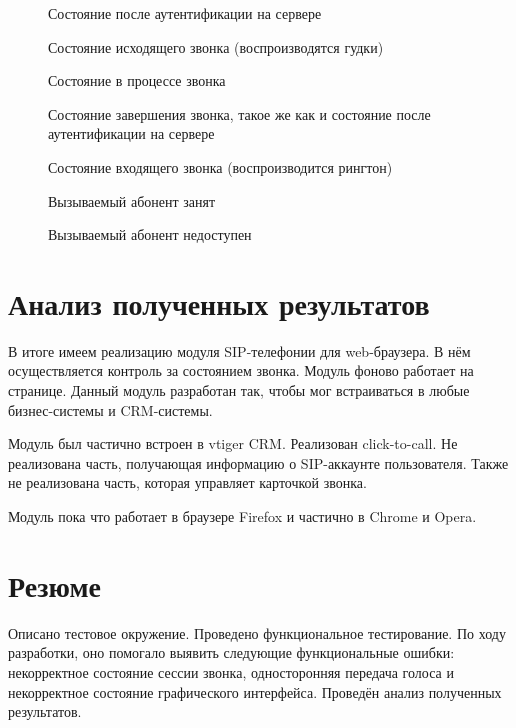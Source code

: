 \begin{figure}[h]
\caption{Состояние после аутентификации на сервере}
\label{image:test2}
\end{figure}

\begin{figure}[h]
\caption{Состояние исходящего звонка (воспроизводятся гудки)}
\label{image:test3}
\end{figure}

\begin{figure}[h]
\caption{Состояние в процессе звонка}
\label{image:test4}
\end{figure}

\begin{figure}[h]
\caption{Состояние завершения звонка, такое же как и состояние после аутентификации на сервере}
\label{image:test5}
\end{figure}

\begin{figure}[h]
\caption{Состояние входящего звонка (воспроизводится рингтон)}
\label{image:test6}
\end{figure}

\begin{figure}[h]
\caption{Вызываемый абонент занят}
\label{image:test7}
\end{figure}

\begin{figure}[h]
\caption{Вызываемый абонент недоступен}
\label{image:test8}
\end{figure}

\section{Анализ полученных результатов}

В итоге имеем реализацию модуля SIP-телефонии для web-браузера. В нём осуществляется контроль за состоянием звонка. Модуль фоново работает на странице. Данный модуль разработан так, чтобы мог встраиваться в любые бизнес-системы и CRM-системы.

Модуль был частично встроен в vtiger CRM. Реализован click-to-call. Не реализована часть, получающая информацию о SIP-аккаунте пользователя. Также не реализована часть, которая управляет карточкой звонка.

Модуль пока что работает в браузере Firefox и частично в Chrome и Opera.

\section{Резюме}

Описано тестовое окружение. Проведено функциональное тестирование. По ходу разработки, оно помогало выявить следующие функциональные ошибки: некорректное состояние сессии звонка, односторонняя передача голоса и некорректное состояние графического интерфейса. Проведён анализ полученных результатов.
